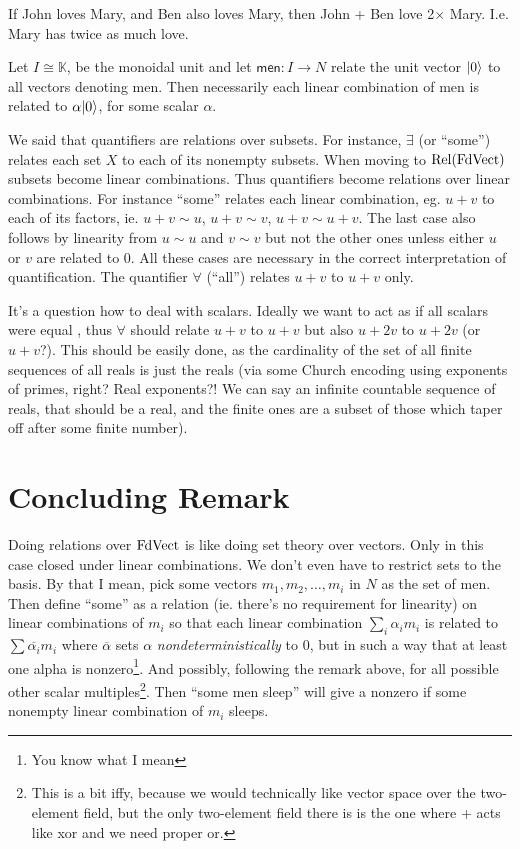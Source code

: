 If John loves Mary, and Ben also loves Mary, then John + Ben love
2$\times$ Mary. I.e. Mary has twice as much love. 

Let $I \cong \mathbb{K}$, be the monoidal unit and let $\mathsf{men} : I \to
N$ relate the unit vector $|{0}\rangle$ to all vectors denoting men. Then
necessarily each linear combination of men is related to
$\alpha|{0}\rangle$, for some scalar $\alpha$. 


We said that quantifiers are relations over subsets. For instance,
$\exists$ (or ``some'') relates each set $X$ to each of its nonempty
subsets. When moving to $\mathrm{Rel}(\mathrm{FdVect})$ subsets become linear
combinations. Thus quantifiers become relations over linear
combinations. For instance ``some'' relates each linear combination,
eg. $u + v$ to each of its factors, ie. $u+v \sim u$, $u+v \sim v$, $u
+ v \sim u + v$. The last case also follows by linearity from $u \sim
u$ and $v \sim v$ but not the other ones unless either $u$ or $v$ are
related to $0$.  All these cases are necessary in the correct
interpretation of quantification. The quantifier $\forall$ (``all'')
relates $u + v$ to $u+v$ only. 

It's a question how to deal with scalars. Ideally we want to act as if
all scalars were equal , thus $\forall$ should relate $u+v$ to $u+v$
but also $u+2v$ to $u+2v$ (or $u+v$?). This should be easily done, as
the cardinality of the set of all finite sequences of all reals is
just the reals (via some Church encoding using exponents of primes,
right? Real exponents?! We can say an infinite countable sequence of
reals, that should be a real, and the finite ones are a subset of
those which taper off after some finite number). 

\section{Concluding Remark}
Doing relations over $\mathrm{FdVect}$ is like doing set theory over
vectors. Only in this case closed under linear combinations. We don't
even have to restrict sets to the basis. By that I mean, pick some
vectors $m_1, m_2, \ldots, m_i$ in $N$ as the set of men. Then define
``some'' as a relation (ie. there's no requirement for linearity) on
linear combinations of $m_i$ so that each linear combination $\sum_i
\alpha_i m_i$ is related to $\sum \overline{\alpha_i} m_i$ where
$\overline{\alpha}$ sets $\alpha$ \emph{nondeterministically} to $0$, but
in such a way that at least one alpha is nonzero\footnote{You know
  what I mean}. And possibly, following the remark above, for all
possible other scalar multiples\footnote{This is a bit iffy, because
  we would technically like vector space over the two-element field,
  but the only two-element field there is is the one where + acts like
  \textsf{xor} and we need proper \textsf{or}.}. Then ``some men
sleep'' will give a nonzero if some nonempty linear combination of
$m_i$ sleeps. 


